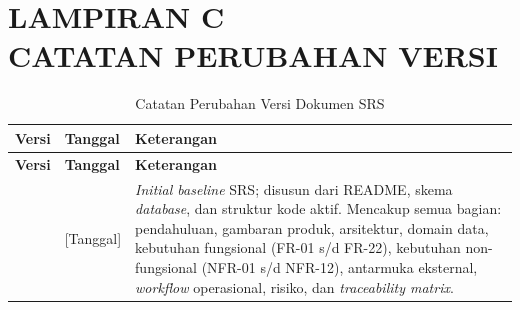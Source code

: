 \clearpage

\section*{LAMPIRAN C \\ CATATAN PERUBAHAN VERSI}
{}

\begin{longtable}{|L{1.5cm}|L{3.5cm}|L{10cm}|}
    \caption{Catatan Perubahan Versi Dokumen SRS}
    \label{tab:changelog} \\
    \hline
    \textbf{Versi} & \textbf{Tanggal} & \textbf{Keterangan} \\
    \hline
    \endfirsthead
    \hline
    \textbf{Versi} & \textbf{Tanggal} & \textbf{Keterangan} \\
    \hline
    \endhead
    \hline
        & [Tanggal]
        & \textit{Initial baseline} SRS; disusun dari README, skema
          \textit{database}, dan struktur kode aktif. Mencakup semua bagian:
          pendahuluan, gambaran produk, arsitektur, domain data, kebutuhan
          fungsional (FR-01 s/d FR-22), kebutuhan non-fungsional (NFR-01 s/d
          NFR-12), antarmuka eksternal, \textit{workflow} operasional, risiko, dan
          \textit{traceability matrix}. \\
    \hline
\end{longtable}
